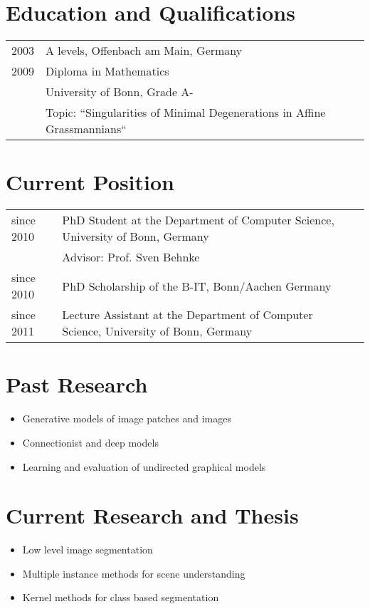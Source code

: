 \documentclass[a4paper,11pt]{article}
\begin{document}
\maketitle

\section{Education and Qualifications}
\begin{tabular}{lll}
    2003 & A levels, Offenbach am Main, Germany\\
    2009 & Diploma in Mathematics \\ & University of Bonn, Grade A-\\
         & Topic: ``Singularities of Minimal Degenerations in Affine Grassmannians``
\end{tabular}

\section{Current Position}
\begin{tabular}{lll}
    since 2010 & PhD Student at the Department of Computer Science, University of Bonn, Germany\\
               & Advisor: Prof. Sven Behnke\\
    since 2010 & PhD Scholarship of the B-IT, Bonn/Aachen Germany\\
    since 2011 & Lecture Assistant at the Department of Computer Science, University of Bonn, Germany
\end{tabular}

\section{Past Research}
\begin{itemize}
    \item Generative models of image patches and images
    \item Connectionist and deep models
    \item Learning and evaluation of undirected graphical models
\end{itemize}

\section{Current Research and Thesis}
\begin{itemize}
    \item Low level image segmentation
    \item Multiple instance methods for scene understanding
    \item Kernel methods for class based segmentation
\end{itemize}

\begin{publications}
\end{publications}
\end{document}
